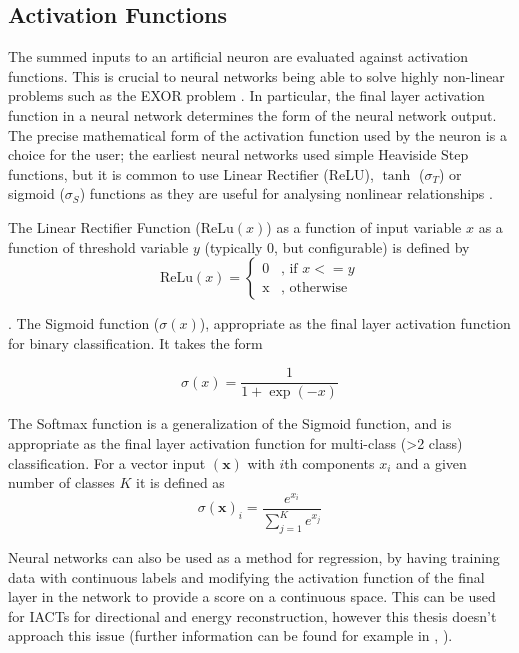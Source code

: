 \subsection{Activation Functions}

The summed inputs to an artificial neuron are evaluated against activation functions. This is crucial to neural networks being able to solve highly non-linear problems such as the EXOR problem \cite{universal}. In particular, the final layer activation function in a neural network determines the form of the neural network output. The precise mathematical form of the activation function used by the neuron is a choice for the user; the earliest neural networks used simple Heaviside Step functions, but 
it is common to use Linear Rectifier (ReLU), $\tanh$ ($\sigma_T$) or sigmoid ($\sigma_S$) functions as they are useful for analysing nonlinear relationships \cite{C++CNN}\cite{Keras}. 

The Linear Rectifier Function ($\textrm{ReLu}(x)$) as a function of input variable $x$ as a function of threshold variable $y$ (typically 0, but configurable) is defined by
\begin{equation}
    \textrm{ReLu}(x)=\begin{cases}\mbox{0} & \mbox{, if } x <= y \\ \mbox{x} & \mbox{, otherwise} \end{cases}
\end{equation}

\cite{Keras}. The Sigmoid function ($\sigma(x)$), appropriate as the final layer activation function for binary classification. It takes the form

\begin{equation}
    \sigma(x)=\frac{1}{1+\exp(-x)}
\end{equation}

The Softmax function is a generalization of the Sigmoid function, and is appropriate as the final layer activation function for multi-class (>2 class) classification. For a vector input $(\textbf{x})$ with $i$th components $x_i $ and a given number of classes $K$ it is defined as
\begin{equation}
    \sigma(\textbf{x})_i=\frac{e^{x_i}}{\sum_{j=1}^K e^{x_j}}
\end{equation}

Neural networks can also be used as a method for regression, by having training data with continuous labels and modifying the activation function of the final layer in the network to provide a score on a continuous space. This can be used for IACTs for directional and energy reconstruction, however this thesis doesn't approach this issue (further information can be found for example in \cite{mikaelphd}, \cite{tjarkicrc}).  

